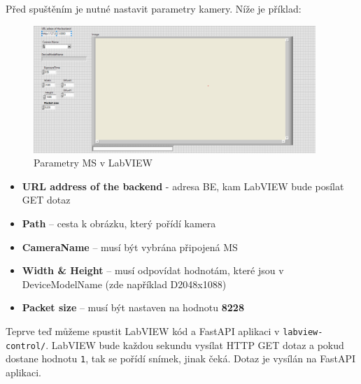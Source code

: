\documentclass[12pt]{article}
\begin{document}
\begin{teamwork}
        Před spuštěním je nutné nastavit parametry kamery.
        Níže je příklad:

        \begin{figure}[hbt!]
            \centering
            \includegraphics[width=0.95\textwidth]{../../img/labview-hyperspectral-cam-settings}
            \caption{Parametry MS v LabVIEW}
            \label{fig:params_ms_labview}
        \end{figure}

        \begin{itemize}
            \item \textbf{URL address of the backend} - adresa BE, kam LabVIEW bude posílat GET dotaz
            \item \textbf{Path} – cesta k obrázku, který pořídí kamera
            \item \textbf{CameraName} – musí být vybrána připojená MS
            \item \textbf{Width \& Height} – musí odpovídat hodnotám, které jsou v DeviceModelName (zde například D2048x1088)
            \item \textbf{Packet size} – musí být nastaven na hodnotu \textbf{8228}
        \end{itemize}

        Teprve teď můžeme spustit LabVIEW kód a FastAPI aplikaci v \texttt{labview-control/}.
        LabVIEW bude každou sekundu vysílat HTTP GET dotaz a pokud dostane hodnotu \texttt{1}, tak se pořídí snímek, jinak čeká.
        Dotaz je vysílán na FastAPI aplikaci.
    \end{teamwork}
\end{document}
